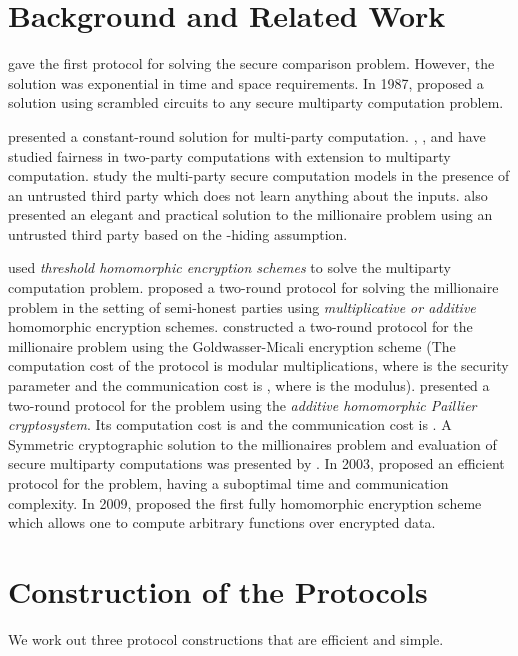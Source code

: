 \documentclass[11pt, letterpaper, romanappendices, onecolumn]{article}
\theoremstyle{plain}\newtheorem{thm}{Theorem}[section]
\theoremstyle{definition}
\theoremstyle{remark}
\begin{document}
\section{Background and Related Work} \label{sec2}
\citet{yao1982protocols} gave the first protocol for solving the secure comparison problem. However, the solution was exponential in time and space requirements. In 1987, \citet{goldreich1987play} proposed a solution using scrambled circuits to any secure multiparty computation problem.

\par \citet{beaver1990round} presented a constant-round solution for multi-party computation. \citet{crypto19871119},  \citet{beaver1990multiparty}, and \citet{goldwasser1991fair} have studied fairness in two-party computations with extension to multiparty computation. \citet{feige1994minimal} study the multi-party secure computation models in the presence of an untrusted third party which does not learn anything about the inputs. \citet{cachin1999efficient} also presented an elegant and practical solution to the millionaire problem using an untrusted third party  based on the -hiding assumption.

\par \citet{schoenmakers2004practical} used \textit{threshold homomorphic encryption schemes} to solve the multiparty computation problem. \citet{lin2005efficient} proposed a two-round protocol for solving the millionaire problem in the setting of semi-honest parties using \textit{multiplicative or additive} homomorphic encryption schemes. \citet{fischlin2001cost} constructed a two-round protocol for the millionaire problem using the Goldwasser-Micali encryption scheme (The computation cost of the protocol is  modular multiplications, where  is the security parameter and the communication cost is , where  is the modulus). \citet{blake2004strong} presented a two-round protocol for the problem using the \textit{additive homomorphic Paillier cryptosystem}. Its computation cost is  and the communication cost is . A Symmetric cryptographic solution to the millionaires problem and evaluation of secure multiparty computations was presented by \citet{shundong2008symmetric}. In 2003, \citet{ioannidis2003efficient} proposed an efficient protocol for the problem, having a suboptimal time and communication complexity. In 2009, \citet{gentry2009fully} proposed the first fully homomorphic encryption scheme which allows one to compute arbitrary functions over encrypted data.


\section{Construction of the Protocols}\label{sec3}
We work out three protocol constructions that are efficient and simple.
\end{document}
